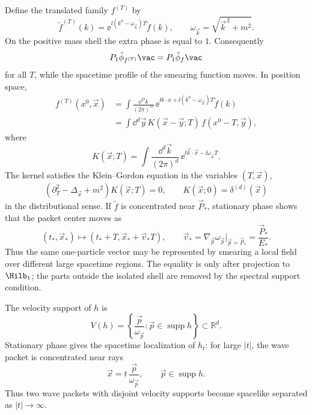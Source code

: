 Define the translated family \(f^{(T)}\) by
\[
  \tilde f^{(T)}(k)
  =
  \ee^{\ii(k^0-\omega_{\vec k})T}\tilde f(k),
  \qquad
  \omega_{\vec k}=\sqrt{\vec k^{\,2}+m^2}.
\]
On the positive mass shell the extra phase is equal to \(1\).  Consequently
\[
  P_1\hat\phi_{f^{(T)}}\vac=P_1\hat\phi_f\vac
\]
for all \(T\), while the spacetime profile of the smearing function moves.  In
position space,
\[
\begin{aligned}
  f^{(T)}(x^0,\vec x)
  &=
  \int\frac{\dd^Dk}{(2\pi)^D}\,
  \ee^{\ii k\cdot x+\ii(k^0-\omega_{\vec k})T}\tilde f(k)
  \\
  &=
  \int\dd^d\vec y\,K(\vec x-\vec y;T)\,
  f(x^0-T,\vec y),
\end{aligned}
\]
where
\[
  K(\vec x;T)
  =
  \int\frac{\dd^d\vec k}{(2\pi)^d}\,
  \ee^{\ii\vec k\cdot\vec x-\ii\omega_{\vec k}T}.
\]
The kernel satisfies the Klein--Gordon equation in the variables
\((T,\vec x)\),
\[
  \left(\partial_T^2-\Delta_{\vec x}+m^2\right)K(\vec x;T)=0,
  \qquad
  K(\vec x;0)=\delta^{(d)}(\vec x)
\]
in the distributional sense.  If \(\tilde f\) is concentrated near
\(\vec P_*\), stationary phase shows that the packet center moves as
\[
  (t_*,\vec x_*)
  \longmapsto
  (t_*+T,\vec x_*+\vec v_*T),
  \qquad
  \vec v_*=\nabla_{\vec p}\omega_{\vec p}\big|_{\vec p=\vec P_*}
  =\frac{\vec P_*}{E_*}.
\]
Thus the same one-particle vector may be represented by smearing a local field
over different large spacetime regions.  The equality is only after projection
to \(\Hilb_1\); the parts outside the isolated shell are removed by the spectral
support condition.

The velocity support of \(h\) is
\[
  V(h)
  =
  \left\{
    \frac{\vec p}{\omega_{\vec p}}:
    \vec p\in\operatorname{supp}h
  \right\}
  \subset\mathbb R^d .
\]
Stationary phase gives the spacetime localization of \(h_t\): for large
\(|t|\), the wave packet is concentrated near rays
\[
  \vec x=t\,\frac{\vec p}{\omega_{\vec p}},
  \qquad
  \vec p\in\operatorname{supp}h .
\]
Thus two wave packets with disjoint velocity supports become spacelike
separated as \(|t|\to\infty\).

